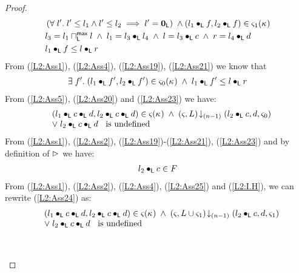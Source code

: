 \begin{lemma}[]
\begin{proof}
\begin{align}
	&\left(\forall\; l'.\; l' \leq l_1 \land l' \leq l_2 \implies l' = \mathbf{0}_{\textsf{L}}\right)\;\land
	(l_1 \bullet_{\textsf{L}} f, l_2 \bullet_{\textsf{L}} f) \in \varsigma_{1}(\kappa_{}) \label{L2:Ass19}\\
	&l_3 = l_1 \sqcap_{\textsf{L}}^{\textsf{max}} l \;\land\; l_1 = l_3 \bullet_{\textsf{L}} l_4 \;\land\; l = l_3 \bullet_{\textsf{L}} c \;\land\; r = l_4 \bullet_{\textsf{L}} d\label{L2:Ass20}\\
	&l_1 \bullet_{\textsf{L}} f \leq l \bullet_{\textsf{L}} r \label{L2:Ass21}
\end{align}
From (\ref{L2:Ass1}), (\ref{L2:Ass4}), (\ref{L2:Ass19}), (\ref{L2:Ass21}) we know that 
%
\begin{align}
	\exists\; f'.\; (l_1 \bullet_{\textsf{L}} f', l_2 \bullet_{\textsf{L}} f') \in \varsigma_{0}(\kappa_{}) \;\land\; l_1 \bullet_{\textsf{L}} f' \leq l \bullet_{\textsf{L}} r \label{L2:Ass23}
\end{align}
%
From (\ref{L2:Ass5}), (\ref{L2:Ass20}) and (\ref{L2:Ass23}) we have:
%
\begin{align}
	\begin{array}{l l}
		&(l_1 \bullet_{\textsf{L}} c \bullet_{\textsf{L}} d, l_2 \bullet_{\textsf{L}} c \bullet_{\textsf{L}} d) \in \varsigma_{}(\kappa_{})\;\land\;  \left(\varsigma_{}, L\right) \!\downarrow_{(n-1)} \left(l_2 \bullet_{\textsf{L}} c, d, \varsigma_{0}\right) \\
		& \lor\; l_2 \bullet_{\textsf{L}} c \bullet_{\textsf{L}} d \hspace*{0.2cm}\text{ is undefined}
	\end{array} \label{L2:Ass24}
\end{align}
From (\ref{L2:Ass1}), (\ref{L2:Ass2}), (\ref{L2:Ass19})-(\ref{L2:Ass21}), (\ref{L2:Ass23}) and by definition of $\rhd$ we have:
\begin{align}
	l_2 \bullet_{\textsf{L}} c \in F \label{L2:Ass25}
\end{align}
From (\ref{L2:Ass1}), (\ref{L2:Ass2}), (\ref{L2:Ass4}), (\ref{L2:Ass25}) and (\ref{L2:I.H}), we can rewrite (\ref{L2:Ass24}) as:
%
\begin{align}
	\begin{array}{l l}
		&(l_1 \bullet_{\textsf{L}} c \bullet_{\textsf{L}} d, l_2 \bullet_{\textsf{L}} c \bullet_{\textsf{L}} d) \in \varsigma_{}(\kappa_{})\;\land\;  \left(\varsigma_{}, L \cup \varsigma_{1}\right) \!\downarrow_{(n-1)} \left(l_2 \bullet_{\textsf{L}} c, d, \varsigma_{1}\right) \\
		& \lor\; l_2 \bullet_{\textsf{L}} c \bullet_{\textsf{L}} d \hspace*{0.2cm}\text{ is undefined}
	\end{array} \label{L2:DismissedGoal4}
\end{align}\\\\

\end{proof}
\end{lemma}
